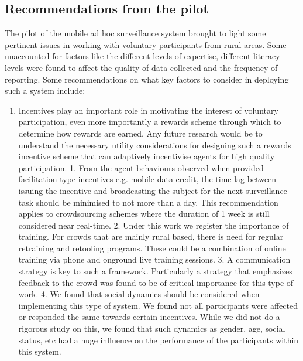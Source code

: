 \documentclass[letterpaper]{article} %
\begin{document}
\subsection{Recommendations from the pilot}
The pilot of the mobile ad hoc surveillance system brought to light some pertinent issues in working with voluntary participants from rural areas. Some unaccounted for factors like the different levels of expertise, different literacy levels were found to affect the quality of data collected and the frequency of reporting. Some recommendations on what key factors to consider in deploying such a system include:
\begin{enumerate}
\item Incentives play an important role in motivating the interest of voluntary participation, even more importantly a rewards scheme through which to determine how rewards are earned. Any future research would be to understand the necessary utility considerations for designing such a rewards incentive scheme that can adaptively incentivise agents for high quality participation.
1. From the agent behaviours observed when provided facilitation type incentives e.g. mobile data credit, the time lag between issuing the incentive and broadcasting the subject for the next surveillance task should be minimised to not more than a day. This recommendation applies to crowdsourcing schemes where the duration of 1 week is still considered near real-time.
2. Under this work we register the importance of training. For crowds that are mainly rural based, there is need for regular retraining and retooling programs. These could be a combination of online training via phone and onground live training sessions.
3. A communication strategy is key to such a framework. Particularly a strategy that emphasizes feedback to the crowd was found to be of critical importance for this type of work.
4. We found that social dynamics should be considered when implementing this type of system. We found not all participants were affected or responded the same towards certain incentives. While we did not do a rigorous study on this, we found that such dynamics as gender, age, social status, etc had a huge influence on the performance of the participants within this system.
\end{enumerate}

\vspace{-2.08mm}
\vspace{-0.99mm}
\end{document}
